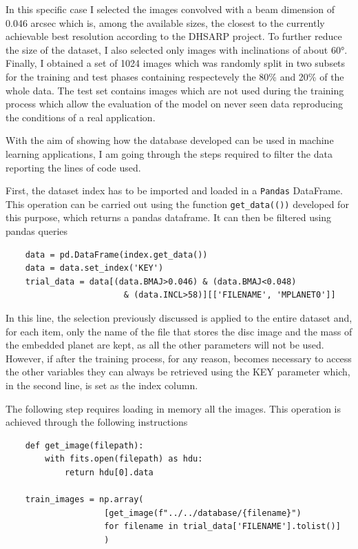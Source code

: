 \documentclass[a4paper,10pt]{report}
\begin{document}
In this specific case I selected the images convolved with a beam dimension of 0.046 arcsec which is,
among the available sizes, the closest to the currently achievable best resolution according to the DHSARP project.
To further reduce the size of the dataset, I also selected only images with inclinations of about
60°.
Finally, I obtained a set of 1024 images which was randomly split in two subsets for the training and
test phases containing respectevely the 80\% and 20\% of the whole data.
The test set contains images which are not used during the training process which allow the evaluation
of the model on never seen data reproducing the conditions of a real application.

With the aim of showing how the database developed can be used in machine learning applications,
I am going through the steps required to filter the data reporting the lines of code used.

First, the dataset index has to be imported and loaded in a \lstinline{Pandas} DataFrame. 
This operation can be carried out using the function \lstinline{get_data(())} developed for this purpose, which returns
a pandas dataframe. It can then be filtered using pandas queries

\begin{lstlisting}
    data = pd.DataFrame(index.get_data())
    data = data.set_index('KEY')
    trial_data = data[(data.BMAJ>0.046) & (data.BMAJ<0.048)
                        & (data.INCL>58)][['FILENAME', 'MPLANET0']]
\end{lstlisting}

In this line, the selection previously discussed is applied to the entire dataset and,
for each item, only the name of the file that stores the disc image and the mass of the embedded planet are kept, as
all the other parameters will not be used. However, if after the training process, for any reason, becomes necessary
to access the other variables they can always be retrieved using the KEY parameter which, in the second line, is set as 
the index column.

The following step requires loading in memory all the images. This operation is achieved through the following
instructions

\begin{lstlisting}
    def get_image(filepath):
        with fits.open(filepath) as hdu:
            return hdu[0].data
    
    train_images = np.array(
                    [get_image(f"../../database/{filename}") 
                    for filename in trial_data['FILENAME'].tolist()]
                    )
\end{lstlisting}
\end{document}
